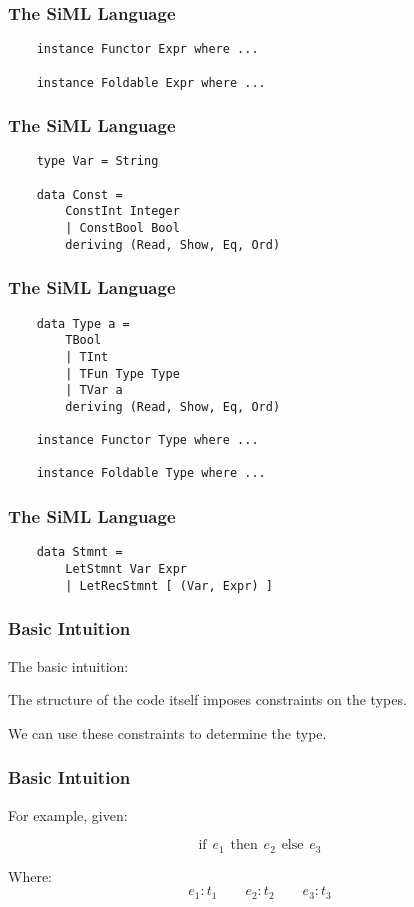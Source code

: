 \documentclass{beamer}
\begin{document}
\begin{frame}[fragile]
\frametitle{The SiML Language}
{\tt \Large{
\begin{verbatim}
    instance Functor Expr where ...

    instance Foldable Expr where ...
\end{verbatim}
}}
\end{frame}

\begin{frame}[fragile]
\frametitle{The SiML Language}
{\tt \Large{
\begin{verbatim}
    type Var = String

    data Const =
        ConstInt Integer
        | ConstBool Bool
        deriving (Read, Show, Eq, Ord)
\end{verbatim}
}}
\end{frame}

\begin{frame}[fragile]
\frametitle{The SiML Language}
{\tt \Large{
\begin{verbatim}
    data Type a =
        TBool
        | TInt
        | TFun Type Type
        | TVar a
        deriving (Read, Show, Eq, Ord)

    instance Functor Type where ...

    instance Foldable Type where ...

\end{verbatim}
}}
\end{frame}

\begin{frame}[fragile]
\frametitle{The SiML Language}
{\tt\Large{
\begin{verbatim}
    data Stmnt =
        LetStmnt Var Expr
        | LetRecStmnt [ (Var, Expr) ]
\end{verbatim}
}}
\end{frame}

\begin{frame}
\frametitle{Basic Intuition}
\begin{center}
\huge{
The basic intuition:

\vspace{20pt}
The structure of the code itself imposes constraints on the types.

\vspace{20pt}
We can use these constraints to determine the type.
}
\end{center}
\end{frame}

\begin{frame}
\frametitle{Basic Intuition}
\begin{center}
\huge{
For example, given:

$$\text{if}\hspace{5pt}e_1\hspace{5pt}\text{then}\hspace{5pt}e_2
\hspace{5pt}\text{else}\hspace{5pt}e_3$$

Where:
$$e_1:t_1\qquad{}e_2:t_2\qquad{}e_3:t_3$$}
\end{center}
\end{frame}
\end{document}
